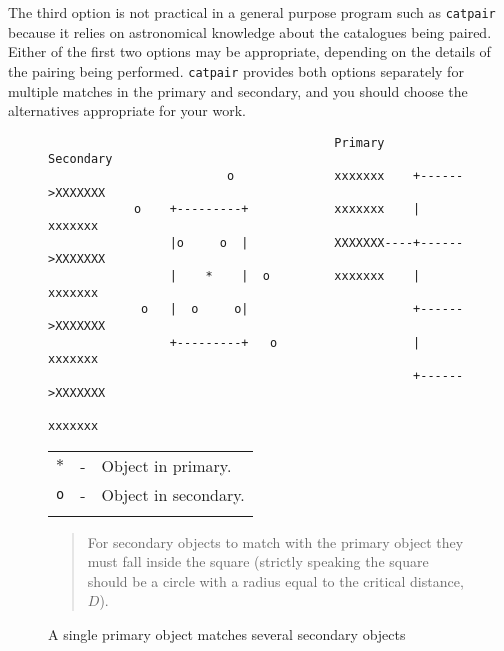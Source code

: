 \documentclass[twoside,11pt]{article}
\renewcommand{\_}{\texttt{\symbol{95}}}
\begin{document}
The third option is not practical in a general purpose program such as
{\tt catpair} because it relies on astronomical knowledge about the
catalogues being paired. Either of the first two options may be
appropriate, depending on the details of the pairing being performed.
{\tt catpair} provides both options separately for multiple matches in
the primary and secondary, and you should choose the alternatives
appropriate for your work.

\begin{figure}[htbp]

\begin{verbatim}
                                        Primary           Secondary
                         o              xxxxxxx    +------>XXXXXXX
            o    +---------+            xxxxxxx    |       xxxxxxx
                 |o     o  |            XXXXXXX----+------>XXXXXXX
                 |    *    |  o         xxxxxxx    |       xxxxxxx
             o   |  o     o|                       +------>XXXXXXX
                 +---------+   o                   |       xxxxxxx
                                                   +------>XXXXXXX
                                                           xxxxxxx
\end{verbatim}

\begin{center}
\begin{tabular}{lll}
{$\ast$} & -  & Object in primary.   \\
{\tt o}  & -  & Object in secondary. \\
    &  &  \\
\end{tabular}

\begin{quote}
For secondary objects to match with the primary object they must fall
inside the square (strictly speaking the square should be a circle with
a radius equal to the critical distance, $D$).
\end{quote}
\end{center}

\caption{A single primary object matches several secondary objects
\label{PAIR_PRIM_MULT} }

\end{figure}
\end{document}
